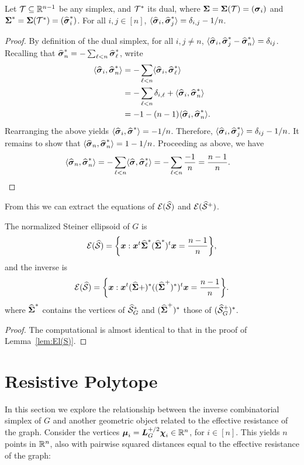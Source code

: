 \begin{lemma}
	\label{lem:dot_dual_vertices}
	Let  $\mathcal{T}\subseteq\mathbb{R}^{n-1}$ be any simplex, and $\mathcal{T}^*$ its dual, where $\boldsymbol{\Sigma}=\boldsymbol{\Sigma}(\mathcal{T})=(\vb*{\sigma}_i)$ and $\boldsymbol{\Sigma}^*=\boldsymbol{\Sigma}(\mathcal{T}^*)=(\widehat{\vb*{\sigma}}^*_i)$. 
	For all $i,j\in[n]$, $\langle \widehat{\vb*{\sigma}}_i,\widehat{\vb*{\sigma}}_j^*\rangle=\delta_{i,j}-1/n$. 
\end{lemma}
\begin{proof}
	By definition of the dual simplex, for all $i,j\neq n$, $\langle \widehat{\vb*{\sigma}}_i,\widehat{\vb*{\sigma}}^*_j-\widehat{\vb*{\sigma}}^*_n\rangle = \delta_{ij}$. Recalling that $\widehat{\vb*{\sigma}}^*_n=-\sum_{\ell<n}\widehat{\vb*{\sigma}}^*_\ell$, write 
	\begin{align*}
	\langle \widehat{\vb*{\sigma}}_i,\widehat{\vb*{\sigma}}^*_n\rangle &= - \sum_{\ell<n}\langle \widehat{\vb*{\sigma}}_i,\widehat{\vb*{\sigma}}^*_\ell\rangle \\
	&= -\sum_{\ell<n} \delta_{i,\ell} + \langle \widehat{\vb*{\sigma}}_i,\widehat{\vb*{\sigma}}^*_n\rangle \\
	&= -1 - (n-1)\langle\widehat{\vb*{\sigma}}_i,\widehat{\vb*{\sigma}}^*_n\rangle.
	\end{align*}
	Rearranging the above yields $\langle \widehat{\vb*{\sigma}}_i,\widehat{\vb*{\sigma}}^*\rangle = -1/n$. Therefore, $\langle \widehat{\vb*{\sigma}}_i,\widehat{\vb*{\sigma}}^*_j\rangle = \delta_{ij} - 1/n$. It remains to show that $\langle\widehat{\vb*{\sigma}}_n,\widehat{\vb*{\sigma}}^*_n\rangle=1-1/n$. Proceeding as above, we have 
	\begin{align*}
	\langle\widehat{\vb*{\sigma}}_n,\widehat{\vb*{\sigma}}^*_n\rangle &= -\sum_{\ell<n}\langle \widehat{\vb*{\sigma}},\widehat{\vb*{\sigma}}^*_\ell\rangle = -\sum_{\ell<n} \frac{-1}{n} = \frac{n-1}{n}.\qedhere
	\end{align*}
\end{proof}

From this we can extract the equations of $\mathcal{E}(\widehat{\mathcal{S}})$ and $\mathcal{E}(\widehat{\mathcal{S}}^+)$. 

\begin{corollary}
	\label{cor:El(Sn)}
	The normalized Steiner ellipsoid of $G$ is 
	\begin{equation*}
	\mathcal{E}(\widehat{\mathcal{S}}) = \bigg\{\vb*{x}:\vb*{x}^t \widehat{\boldsymbol{\Sigma}}^*(\widehat{\boldsymbol{\Sigma}}^*)^t\vb*{x} = \frac{n-1}{n}\bigg\},
	\end{equation*}
	and the inverse is 
	\begin{equation*}
		\mathcal{E}(\widehat{\mathcal{S}}) = \bigg\{\vb*{x}:\vb*{x}^t (\widehat{\boldsymbol{\Sigma}}+)^*((\widehat{\boldsymbol{\Sigma}}^+)^*)^t\vb*{x} = \frac{n-1}{n}\bigg\}.
	\end{equation*}
	where $\widehat{\boldsymbol{\Sigma}}^*$ contains the vertices of $\widehat{\mathcal{S}}_G^*$ and $(\widehat{\boldsymbol{\Sigma}}^+)^*$ those of $(\widehat{\mathcal{S}}_G^+)^*$. 
\end{corollary}
\begin{proof}
	The computational is almost identical to that in the proof of Lemma~\ref{lem:El(S)}.
\end{proof}



\section{Resistive Polytope}
\label{sec:resistive_polytope}
In this section we explore the relationship between the inverse combinatorial simplex of $G$ and another geometric object related to the effective resistance of the graph. Consider the vertices $\vb*{\mu}_i=\vb*{L}_G^{+/2}\boldsymbol{\chi}_i\in\mathbb{R}^n$, for $i\in[n]$. This yields $n$ points in $\mathbb{R}^n$, also with pairwise squared distances equal to the effective resistance of the graph: 


